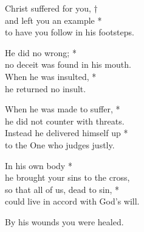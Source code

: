 Christ suffered for you, †\\
and left you an example *\\
to have you follow in his footsteps.

He did no wrong; *\\
no deceit was found in his mouth.\\
When he was insulted, *\\
he returned no insult.

When he was made to suffer, *\\
he did not counter with threats.\\
Instead he delivered himself up *\\
to the One who judges justly.

In his own body *\\
he brought your sins to the cross,\\
so that all of us, dead to sin, *\\
could live in accord with God’s will.

By his wounds you were healed.